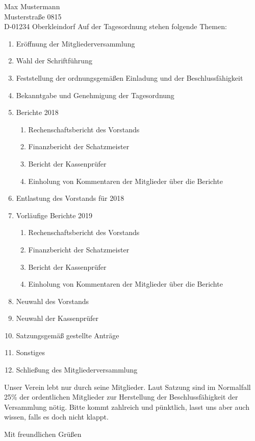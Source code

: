 \documentclass[../Vorlagen/de-RSE_Brief,a4paper]{scrlttr2}
\begin{document}
\begin{letter}{
    Max Mustermann\\
    Musterstraße 0815\\
    D-01234 Oberkleindorf
}
\clearpage
\vspace{2em}
Auf der Tagesordnung stehen folgende Themen:
\begin{enumerate}
\setlength\itemsep{0em}
\item Eröffnung der Mitgliederversammlung
\item Wahl der Schriftführung
\item Feststellung der ordnungsgemäßen Einladung und der Beschlussfähigkeit
\item Bekanntgabe und Genehmigung der Tagesordnung
\item Berichte 2018
\begin{enumerate}
 \item Rechenschaftsbericht des Vorstands
 \item Finanzbericht der Schatzmeister
 \item Bericht der Kassenprüfer
 \item Einholung von Kommentaren der Mitglieder über die Berichte
\end{enumerate}
\item Entlastung des Vorstands für 2018
\item Vorläufige Berichte 2019
\begin{enumerate}
 \item Rechenschaftsbericht des Vorstands
 \item Finanzbericht der Schatzmeister
 \item Bericht der Kassenprüfer
 \item Einholung von Kommentaren der Mitglieder über die Berichte
\end{enumerate}
\item Neuwahl des Vorstands
\item Neuwahl der Kassenprüfer
\item Satzungsgemäß gestellte Anträge
\item Sonstiges
\item Schließung des Mitgliederversammlung
\end{enumerate}

Unser Verein lebt nur durch seine Mitglieder.
Laut Satzung sind im Normalfall 25\% der ordentlichen Mitglieder zur Herstellung der Beschlussfähigkeit der Versammlung nötig.
Bitte kommt zahlreich und pünktlich, lasst uns aber auch wissen, falls es doch nicht klappt.

\closing{Mit freundlichen Grüßen}
\end{letter}
\end{document}
